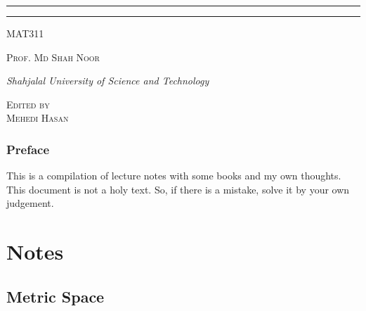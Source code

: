 \documentclass[12pt,oneside,a4paper]{book}
\newcommand{\course}{MAT311}
\newcommand{\prof}{Prof. Md Shah Noor}
\theoremstyle{remark}
\theoremstyle{definition}
\begin{document}
\begin{titlepage}
\rule{345pt}{0.4pt}\vspace*{-\baselineskip}\vspace{3.2pt}
\rule{345pt}{1.6pt}

\vspace{2\baselineskip}

{\scshape \Large{\course}} 

\vspace*{5\baselineskip}



\vspace{0.5\baselineskip} 

{\scshape   \Large \prof\\ }

\vspace{0.75\baselineskip} 

{\textit{\large Shahjalal University of Science and Technology}} 

\vfill 

\vspace{0.3\baselineskip} 


{\scshape \large Edited by\\  Mehedi Hasan} 
\vspace*{40pt}
\end{titlepage}
\newpage
\section*{Preface}
This is a compilation of lecture notes with some books and my own thoughts. This document is not a holy text. So, if there is a mistake, solve it by your own judgement.
\newpage
\tableofcontents
\newpage
{}
\part{Notes}
\chapter{Metric Space}
\end{document}
